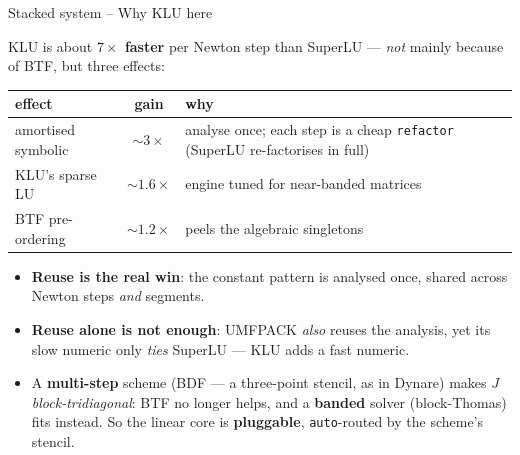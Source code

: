 \documentclass[11pt,aspectratio=169]{beamer}
\begin{document}
\begin{frame}{Stacked system -- Why KLU here}

KLU is about \textbf{$7\times$ faster} per Newton step than SuperLU — \emph{not}
mainly because of BTF, but three effects:

\begin{center}
\small
\renewcommand{\arraystretch}{1.1}
\begin{tabular}{l c p{6.6cm}}
  \toprule
  effect & gain & why \\
  \midrule
  amortised symbolic & $\sim\!3\times$ & analyse once; each step is a cheap
    \texttt{refactor} (SuperLU re-factorises in full) \\
  KLU's sparse LU     & $\sim\!1.6\times$ & engine tuned for near-banded matrices \\
  BTF pre-ordering    & $\sim\!1.2\times$ & peels the algebraic singletons \\
  \bottomrule
\end{tabular}
\end{center}

\begin{itemize}

\item \textbf{Reuse is the real win}: the constant pattern is analysed once,
  shared across Newton steps \emph{and} segments.

\item \textbf{Reuse alone is not enough}: UMFPACK \emph{also} reuses the
  analysis, yet its slow numeric only \emph{ties} SuperLU — KLU adds a fast
  numeric.

\item A \textbf{multi-step} scheme (BDF — a three-point stencil, as in Dynare)
  makes $J$ \emph{block-tridiagonal}: BTF no longer helps, and a \textbf{banded}
  solver (block-Thomas) fits instead. So the linear core is \textbf{pluggable},
  \texttt{auto}-routed by the scheme's stencil.

\end{itemize}

\end{frame}
\end{document}
